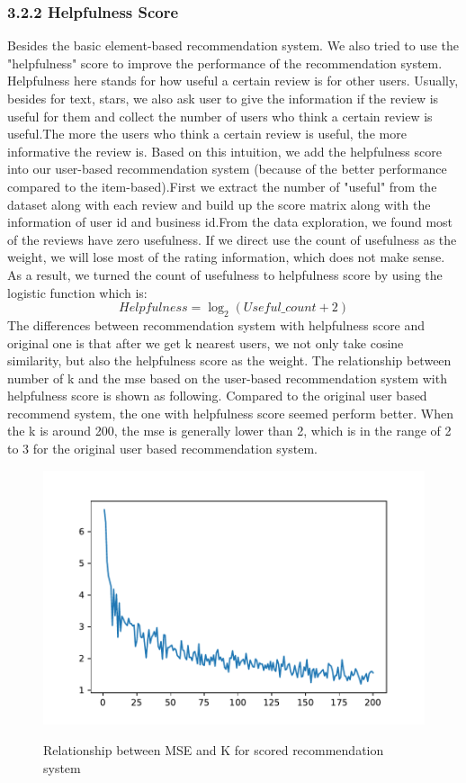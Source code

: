 \documentclass{neu_handout}
\begin{document}
\subsubsection*{3.2.2 Helpfulness Score}
Besides the basic element-based recommendation system. We also tried to use the "helpfulness" score to improve the performance of the recommendation system. Helpfulness here stands for how useful a certain review is for other users. Usually, besides for text, stars, we also ask user to give the information if the review is useful for them and collect the number of users who think a certain review is useful.The more the users who think a certain review is useful, the more informative the review is. Based on this intuition, we add the helpfulness score into our user-based recommendation system (because of the better performance compared to the item-based).First we extract the number of "useful" from the dataset along with each review and build up the score matrix along with the information of user id and business id.From the data exploration, we found most of the reviews have zero usefulness. If we direct use the count of usefulness as the weight, we will lose most of the rating information, which does not make sense. As a result, we turned the count of usefulness to helpfulness score by using the logistic function which is:
$$Helpfulness=\log_2(Useful\_count+2)$$
The differences between recommendation system with helpfulness score and original one is  that after we get k nearest users, we not only take cosine similarity, but also the helpfulness score as the weight. The relationship between number of k and the mse based on the user-based recommendation system with helpfulness score is shown as following. Compared to the original user based recommend system, the one with helpfulness score seemed perform better. When the k is around 200, the mse is generally lower than 2, which is in the range of 2 to 3 for the original user based recommendation system. 
\begin{figure}[h]
	\centering
	\subfigure
	{
		\includegraphics[width=0.5\linewidth]{mse_k_user_based_scored}
	}
	\caption{Relationship between MSE and K for scored recommendation system}
\end{figure}
\end{document}
